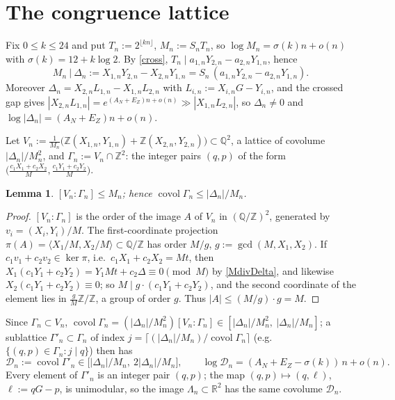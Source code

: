 \documentclass[11pt]{amsart}
\newtheorem{lemma}[theorem]{Lemma}
\theoremstyle{remark}
\newcommand{\Z}{\mathbb Z}\newcommand{\Q}{\mathbb Q}\newcommand{\R}{\mathbb R}
\newcommand{\cD}{\mathcal D}\newcommand{\cK}{\mathcal K}
\begin{document}
\section{The congruence lattice}
Fix $0\le k\le24$ and put $T_n:=2^{\lfloor kn\rfloor}$, $M_n:=S_nT_n$, so $\log M_n=\sigma(k)n+o(n)$ with $\sigma(k)=12+k\log2$. By \eqref{cross}, $T_n\mid a_{1,n}Y_{2,n}-a_{2,n}Y_{1,n}$, hence
\begin{equation}\label{MdivDelta}
M_n\ \big|\ \Delta_n:=X_{1,n}Y_{2,n}-X_{2,n}Y_{1,n}=S_n\,(a_{1,n}Y_{2,n}-a_{2,n}Y_{1,n}).
\end{equation}
Moreover $\Delta_n=X_{2,n}L_{1,n}-X_{1,n}L_{2,n}$ with $L_{i,n}:=X_{i,n}G-Y_{i,n}$, and the crossed gap gives $|X_{2,n}L_{1,n}|=e^{(A_N+E_Z)n+o(n)}\gg|X_{1,n}L_{2,n}|$, so $\Delta_n\ne0$ and $\log|\Delta_n|=(A_N+E_Z)n+o(n)$.

Let $V_n:=\tfrac1{M_n}\bigl(\Z(X_{1,n},Y_{1,n})+\Z(X_{2,n},Y_{2,n})\bigr)\subset\Q^2$, a lattice of covolume $|\Delta_n|/M_n^2$, and $\Gamma_n:=V_n\cap\Z^2$: the integer pairs $(q,p)$ of the form $\bigl(\tfrac{c_1X_1+c_2X_2}{M},\tfrac{c_1Y_1+c_2Y_2}{M}\bigr)$.

\begin{lemma}\label{index} $[V_n:\Gamma_n]\le M_n$; hence $\operatorname{covol}\Gamma_n\le|\Delta_n|/M_n$.\end{lemma}
\begin{proof}
$[V_n:\Gamma_n]$ is the order of the image $A$ of $V_n$ in $(\Q/\Z)^2$, generated by $v_i=(X_i,Y_i)/M$. The first-coordinate projection $\pi(A)=\langle X_1/M,X_2/M\rangle\subset\Q/\Z$ has order $M/g$, $g:=\gcd(M,X_1,X_2)$. If $c_1v_1+c_2v_2\in\ker\pi$, i.e.\ $c_1X_1+c_2X_2=Mt$, then $X_1(c_1Y_1+c_2Y_2)=Y_1Mt+c_2\Delta\equiv0\pmod M$ by \eqref{MdivDelta}, and likewise $X_2(c_1Y_1+c_2Y_2)\equiv0$; so $M\mid g\cdot(c_1Y_1+c_2Y_2)$, and the second coordinate of the element lies in $\tfrac gM\Z/\Z$, a group of order $g$. Thus $|A|\le(M/g)\cdot g=M$.
\end{proof}
Since $\Gamma_n\subset V_n$, $\operatorname{covol}\Gamma_n=(|\Delta_n|/M_n^2)[V_n:\Gamma_n]\in[|\Delta_n|/M_n^2,\ |\Delta_n|/M_n]$; a sublattice $\Gamma'_n\subset\Gamma_n$ of index $j=\lceil(|\Delta_n|/M_n)/\operatorname{covol}\Gamma_n\rceil$ (e.g.\ $\{(q,p)\in\Gamma_n:j\mid q\}$) then has
\begin{equation}\label{covol}
\cD_n:=\operatorname{covol}\Gamma'_n\in\bigl[|\Delta_n|/M_n,\ 2|\Delta_n|/M_n\bigr],\qquad \log\cD_n=(A_N+E_Z-\sigma(k))\,n+o(n).
\end{equation}
Every element of $\Gamma'_n$ is an integer pair $(q,p)$; the map $(q,p)\mapsto(q,\ell)$, $\ell:=qG-p$, is unimodular, so the image $\Lambda_n\subset\R^2$ has the same covolume $\cD_n$.
\end{document}
